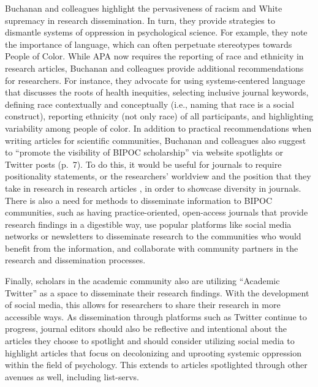 \documentclass[
  11pt,
]{book}
\begin{document}
Buchanan and colleagues \citeyearpar{buchanan_upending_2021} highlight the pervasiveness of racism and White supremacy in research dissemination. In turn, they provide strategies to dismantle systems of oppression in psychological science. For example, they note the importance of language, which can often perpetuate stereotypes towards People of Color. While APA now requires the reporting of race and ethnicity in research articles, Buchanan and colleagues \citeyearpar{buchanan_upending_2021} provide additional recommendations for researchers. For instance, they advocate for using systems-centered language that discusses the roots of health inequities, selecting inclusive journal keywords, defining race contextually and conceptually (i.e., naming that race is a social construct), reporting ethnicity (not only race) of all participants, and highlighting variability among people of color. In addition to practical recommendations when writing articles for scientific communities, Buchanan and colleagues \citeyearpar{buchanan_upending_2021} also suggest to ``promote the visibility of BIPOC scholarship'' via website spotlights or Twitter posts (p.~7). To do this, it would be useful for journals to require positionality statements, or the researchers' worldview and the position that they take in research in research articles \citep{darwin_holmes_researcher_2020, savin-baden_qualitative_2023}, in order to showcase diversity in journals. There is also a need for methods to disseminate information to BIPOC communities, such as having practice-oriented, open-access journals that provide research findings in a digestible way, use popular platforms like social media networks or newsletters to disseminate research to the communities who would benefit from the information, and collaborate with community partners in the research and dissemination processes.

Finally, scholars in the academic community also are utilizing ``Academic Twitter'' as a space to disseminate their research findings. With the development of social media, this allows for researchers to share their research in more accessible ways. As dissemination through platforms such as Twitter continue to progress, journal editors should also be reflective and intentional about the articles they choose to spotlight and should consider utilizing social media to highlight articles that focus on decolonizing and uprooting systemic oppression within the field of psychology. This extends to articles spotlighted through other avenues as well, including list-servs.
\end{document}
